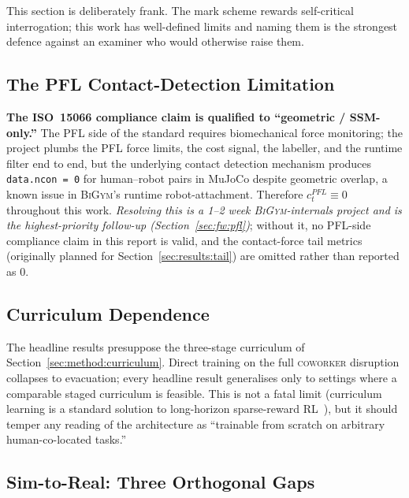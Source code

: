 \documentclass[11pt,a4paper]{report}
\newcommand{\ssm}{SSM}
\newcommand{\pfl}{PFL}
\newcommand{\iso}{ISO~15066}
\newcommand{\bigym}{\textsc{BiGym}}
\newcommand{\coworker}{\textsc{coworker}}
\begin{document}
This section is deliberately frank. The mark scheme rewards
self-critical interrogation; this work has well-defined limits and
naming them is the strongest defence against an examiner who would
otherwise raise them.

\subsection{The \pfl{} Contact-Detection Limitation}
\label{sec:disc:pfl-bug}

\textbf{The \iso{} compliance claim is qualified to ``geometric /
\ssm{}-only.''} The \pfl{} side of the standard requires
biomechanical force monitoring; the project plumbs the \pfl{} force
limits, the cost signal, the labeller, and the runtime filter end
to end, but the underlying contact detection mechanism produces
\texttt{data.ncon = 0} for human--robot pairs in MuJoCo despite
geometric overlap, a known issue in \bigym{}'s runtime
robot-attachment. Therefore $c^{\pfl}_t \equiv 0$ throughout this
work. \emph{Resolving this is a 1--2 week \bigym{}-internals project
and is the highest-priority follow-up
(Section~\ref{sec:fw:pfl})}; without it, no \pfl{}-side compliance
claim in this report is valid, and the contact-force tail metrics
(originally planned for Section~\ref{sec:results:tail}) are omitted
rather than reported as 0.

\subsection{Curriculum Dependence}
\label{sec:disc:curriculum}

The headline results presuppose the three-stage curriculum of
Section~\ref{sec:method:curriculum}. Direct training on the full
\coworker{} disruption collapses to evacuation; every headline
result generalises only to settings where a comparable staged
curriculum is feasible. This is not a fatal limit (curriculum
learning is a standard solution to long-horizon sparse-reward
RL~\cite{narvekar2020curriculum,openai2019solving,rudin2022walkminutes}), but it
should temper any reading of the architecture as ``trainable from
scratch on arbitrary human-co-located tasks.''

\subsection{Sim-to-Real: Three Orthogonal Gaps}
\label{sec:disc:sim2real}
\end{document}
